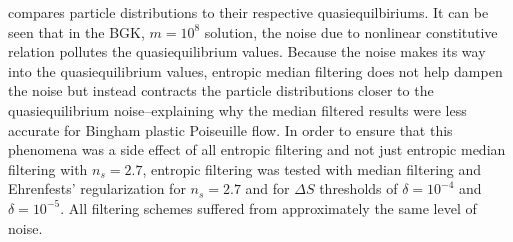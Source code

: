 \documentclass{article}
\begin{document}
 compares particle distributions to their respective quasiequilbiriums.
It can be seen that in the BGK, $m = 10^8$ solution, the noise due to nonlinear constitutive relation pollutes the quasiequilibrium values.
Because the noise makes its way into the quasiequilibrium values, entropic median filtering does not help dampen the noise but instead contracts the particle distributions closer to the quasiequilibrium noise--explaining why the median filtered results were less accurate for Bingham plastic Poiseuille flow.
In order to ensure that this phenomena was a side effect of all entropic filtering and not just entropic median filtering with $n_s = 2.7$, entropic filtering was tested with median filtering and Ehrenfests' regularization for $n_s = 2.7$ and for $\Delta S$ thresholds of $\delta = 10^{-4}$ and $\delta = 10^{-5}$.
All filtering schemes suffered from approximately the same level of noise.
\end{document}
